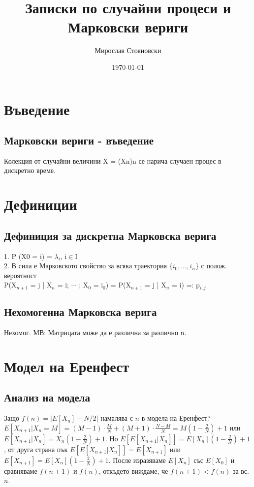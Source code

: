 \documentclass{article}
\title{Записки по случайни процеси и Марковски вериги}
\author{Мирослав Стояновски}
\date{\today}
\begin{document}
\maketitle

\section{Въведение}
\subsection{Марковски вериги - въведение}
Колекция от случайни величини X = (Xn)n се нарича случаен процес в дискретно време.

\section{Дефиниции}
\subsection{Дефиниция за дискретна Марковска верига}
1. P (X0 = i) = $\lambda_i$, i$\in$I \\
2. В сила е Марковското свойство за всяка траектория $\{i_0,...,i_n\}$ с полож. вероятност \\
P(X$_{n+1}$ = j | X$_n$ = i; $\cdots$ ; X$_0$ = i$_0$) = P(X$_{n+1}$ = j | X$_n$ = i) =: p$_{i,j}$

\subsection{Нехомогенна Марковска верига}
Нехомог. МВ: Матрицата може да е различна за различно n.

\section{Модел на Еренфест}
\subsection{Анализ на модела}
Защо $f(n) = |E[X_n] - N/2|$ намалява с $n$ в модела на Еренфест? \\
$E[X_{n+1} | X_n=M] = (M-1)\cdot\frac{M}{N} + (M+1)\cdot\frac{N-M}{N} = M\left(1-\frac{2}{N}\right)+1$ или $E[X_{n+1}|X_n]=X_n\left(1-\frac{2}{N}\right)+1$.
Но $E[E[X_{n+1}|X_n]]=E[X_n]\left(1-\frac{2}{N}\right)+1$, от друга страна пък $E[E[X_{n+1}|X_n]]=E[X_{n+1}]$ или $E[X_{n+1}]=E[X_n]\left(1-\frac{2}{N}\right)+1$.
После изразяваме $E[X_n]$ със $E[X_0]$ и сравняваме $f(n+1)$ и $f(n)$, откъдето виждаме, че $f(n+1)<f(n)$ за вс. $n$.
\end{document}
